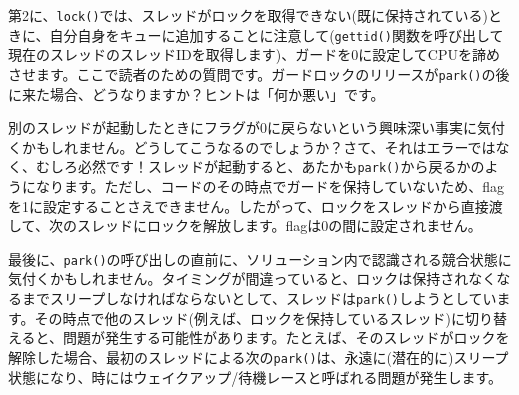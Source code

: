 第2に、\texttt{lock()}では、スレッドがロックを取得できない(既に保持されている)ときに、自分自身をキューに追加することに注意して(\texttt{gettid()}関数を呼び出して現在のスレッドのスレッドIDを取得します)、ガードを0に設定してCPUを諦めさせます。ここで読者のための質問です。ガードロックのリリースが\texttt{park()}の後に来た場合、どうなりますか？ヒントは「何か悪い」です。

別のスレッドが起動したときにフラグが0に戻らないという興味深い事実に気付くかもしれません。どうしてこうなるのでしょうか？さて、それはエラーではなく、むしろ必然です！スレッドが起動すると、あたかも\texttt{park()}から戻るかのようになります。ただし、コードのその時点でガードを保持していないため、flagを1に設定することさえできません。したがって、ロックをスレッドから直接渡して、次のスレッドにロックを解放します。flagは0の間に設定されません。

最後に、\texttt{park()}の呼び出しの直前に、ソリューション内で認識される競合状態に気付くかもしれません。タイミングが間違っていると、ロックは保持されなくなるまでスリープしなければならないとして、スレッドは\texttt{park()}しようとしています。その時点で他のスレッド(例えば、ロックを保持しているスレッド)に切り替えると、問題が発生する可能性があります。たとえば、そのスレッドがロックを解除した場合、最初のスレッドによる次の\texttt{park()}は、永遠に(潜在的に)スリープ状態になり、時にはウェイクアップ/待機レースと呼ばれる問題が発生します。

